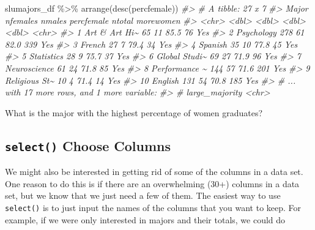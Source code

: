 \documentclass[
]{book}
\newenvironment{Shaded}{\begin{snugshade}}{\end{snugshade}}
\newcommand{\CommentTok}[1]{\textcolor[rgb]{0.56,0.35,0.01}{\textit{#1}}}
\newcommand{\FunctionTok}[1]{\textcolor[rgb]{0.00,0.00,0.00}{#1}}
\newcommand{\NormalTok}[1]{#1}
\newcommand{\SpecialCharTok}[1]{\textcolor[rgb]{0.00,0.00,0.00}{#1}}
\begin{document}
\begin{Shaded}
\begin{Highlighting}[]
\NormalTok{slumajors\_df }\SpecialCharTok{\%\textgreater{}\%} \FunctionTok{arrange}\NormalTok{(}\FunctionTok{desc}\NormalTok{(percfemale))}
\CommentTok{\#\textgreater{} \# A tibble: 27 x 7}
\CommentTok{\#\textgreater{}    Major         nfemales nmales percfemale ntotal morewomen}
\CommentTok{\#\textgreater{}    \textless{}chr\textgreater{}            \textless{}dbl\textgreater{}  \textless{}dbl\textgreater{}      \textless{}dbl\textgreater{}  \textless{}dbl\textgreater{} \textless{}chr\textgreater{}    }
\CommentTok{\#\textgreater{}  1 Art \& Art Hi\textasciitilde{}       65     11       85.5     76 Yes      }
\CommentTok{\#\textgreater{}  2 Psychology         278     61       82.0    339 Yes      }
\CommentTok{\#\textgreater{}  3 French              27      7       79.4     34 Yes      }
\CommentTok{\#\textgreater{}  4 Spanish             35     10       77.8     45 Yes      }
\CommentTok{\#\textgreater{}  5 Statistics          28      9       75.7     37 Yes      }
\CommentTok{\#\textgreater{}  6 Global Studi\textasciitilde{}       69     27       71.9     96 Yes      }
\CommentTok{\#\textgreater{}  7 Neuroscience        61     24       71.8     85 Yes      }
\CommentTok{\#\textgreater{}  8 Performance \textasciitilde{}      144     57       71.6    201 Yes      }
\CommentTok{\#\textgreater{}  9 Religious St\textasciitilde{}       10      4       71.4     14 Yes      }
\CommentTok{\#\textgreater{} 10 English            131     54       70.8    185 Yes      }
\CommentTok{\#\textgreater{} \# ... with 17 more rows, and 1 more variable:}
\CommentTok{\#\textgreater{} \#   large\_majority \textless{}chr\textgreater{}}
\end{Highlighting}
\end{Shaded}

What is the major with the highest percentage of women graduates?

\hypertarget{select-choose-columns}{%
\subsection{\texorpdfstring{\texttt{select()} Choose Columns}{select() Choose Columns}}\label{select-choose-columns}}

We might also be interested in getting rid of some of the columns in a data set. One reason to do this is if there are an overwhelming (30+) columns in a data set, but we know that we just need a few of them. The easiest way to use \texttt{select()} is to just input the names of the columns that you want to keep. For example, if we were only interested in majors and their totals, we could do
\end{document}
